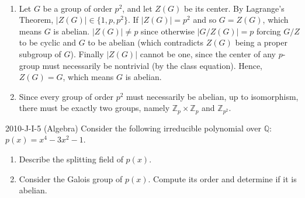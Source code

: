 \documentclass{article}
\begin{document}
\begin{solutions}
	$ $\newline \vspace{-1cm}
	\begin{enumerate}[itemsep =-2pt,label = (\alph{*})]
		\item Let $G$ be a group of order $p^{2}$, and let $Z(G)$ be its center. By Lagrange's Theorem, $|Z(G)| \in \{1, p, p^{2}\}$. If $|Z(G)| = p^{2}$ and so $G = Z(G)$, which means $G$ is abelian. $|Z(G)| \neq p$ since otherwise $|G/Z(G)| = p$ forcing $G/Z$ to be cyclic and $G$ to be abelian (which contradicts $Z(G)$ being a proper subgroup of $G$). Finally $|Z(G)|$ cannot be one, since the center of any $p$-group must necessarily be nontrivial (by the class equation). Hence, $Z(G) = G$, which means $G$ is abelian. 
		\item Since every group of order $p^{2}$ must necessarily be abelian, up to isomorphism, there must be exactly two groups, namely $\mathbb{Z}_{p}\times \mathbb{Z}_{p}$ and $\mathbb{Z}_{p^{2}}$. 
	\end{enumerate}
\end{solutions}
\begin{prb}{2010-J-I-5 (Algebra)}
	Consider the following irreducible polynomial over $\mathbb{Q}$: $p(x) = x^{4} - 3x^{2} - 1$. \vspace{-0.35cm}
	\begin{enumerate}[itemsep =-2pt,label = (\alph{*})]
		\item Describe the splitting field of $p(x)$. 
		\item Consider the Galois group of $p(x)$. Compute its order and determine if it is abelian. 
	\end{enumerate}
\end{prb}
\end{document}
